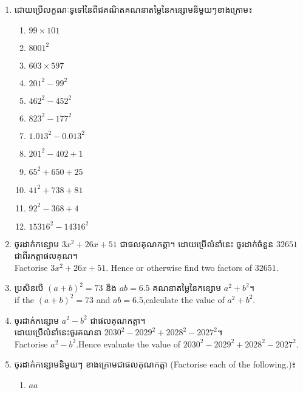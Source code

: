 \begin{enumerate}
\item  ដោយប្រើលក្ខណៈទូទៅនៃពីជគណិតគណនាតម្លៃនៃកន្សោមនិមួយៗខាងក្រោម៖
\begin{multicols}{3}
\begin{enumerate}[label=\alph*.]
\item $99\times 101$
\item $8001^2$
\item $603\times 597$
\item $201^2-99^2$
\item $462^2-452^2$
\item $823^2-177^2$
\item $1.013^2-0.013^2$
\item $201^2-402+1$
\item $65^2+650+25$
\item $41^2+738+81$
\item $92^2-368+4$
\item $15 316^2-14316^2$
\end{enumerate}
\end{multicols}

\item ចូរដាក់កន្សោម  $3x^2+26x+51$ ជាផលគុណកត្តា។ ដោយប្រើលំនាំនេះ ចូរដាក់ចំនួន $32651$ ជាពីរកត្តាផលគុណ។\\Factorise $3x^2+26x+51$. Hence or otherwise find two factors of $32651$.

\item ប្រសិនបើ $(a+b)^2=73$ និង $ab=6.5$ គណនាតម្លៃនៃកន្សោម $a^2+b^2$។\\
if the $(a+b)^2=73$  and $ab=6.5$,calculate the value of $a^2+b^2$.
\item ចូរដាក់កន្សោម $a^2-b^2$ ជាផលគុណកត្តា។\\ ដោយប្រើលំនាំនេះចូរគណនា $2030^2-2029^2+2028^2-2027^2$។
\\Factorise $a^2-b^2$.Hence evaluate the value of $2030^2-2029^2+2028^2-2027^2$.











\item  ចូរដាក់កន្សោមនិមួយៗ ខាងក្រោមជាផលគុណកត្តា (Factorise each of the following.)៖
\begin{multicols}{4}
\begin{enumerate}[label=\alph*.]
\item $aa$
\end{enumerate}
\end{multicols}




\end{enumerate}
